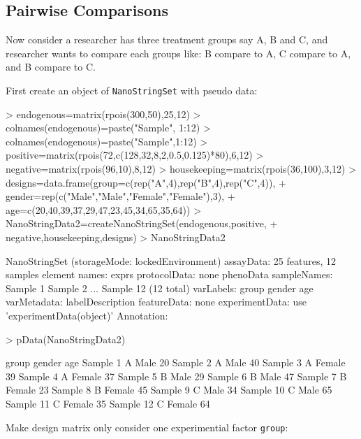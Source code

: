 \documentclass[12pt]{article}
\begin{document}
\subsection{Pairwise Comparisons}
Now consider a researcher has three treatment groups say A, B and C, 
and researcher wants to compare each groups like: B compare to A, 
C compare to A, and B compare to C.


First create an object of {\tt NanoStringSet} with pseudo data:
\begin{Schunk}
\begin{Sinput}
> endogenous=matrix(rpois(300,50),25,12)
> colnames(endogenous)=paste("Sample", 1:12)
> colnames(endogenous)=paste("Sample",1:12)
> positive=matrix(rpois(72,c(128,32,8,2,0.5,0.125)*80),6,12)
> negative=matrix(rpois(96,10),8,12)
> housekeeping=matrix(rpois(36,100),3,12)
> designs=data.frame(group=c(rep("A",4),rep("B",4),rep("C",4)),
+                    gender=rep(c("Male","Male","Female","Female"),3),
+                    age=c(20,40,39,37,29,47,23,45,34,65,35,64))
> NanoStringData2=createNanoStringSet(endogenous,positive,
+                                  negative,housekeeping,designs)
> NanoStringData2
\end{Sinput}
\begin{Soutput}
NanoStringSet (storageMode: lockedEnvironment)
assayData: 25 features, 12 samples 
  element names: exprs 
protocolData: none
phenoData
  sampleNames: Sample 1 Sample 2 ... Sample 12 (12 total)
  varLabels: group gender age
  varMetadata: labelDescription
featureData: none
experimentData: use 'experimentData(object)'
Annotation:  
\end{Soutput}
\begin{Sinput}
> pData(NanoStringData2)
\end{Sinput}
\begin{Soutput}
          group gender age
Sample 1      A   Male  20
Sample 2      A   Male  40
Sample 3      A Female  39
Sample 4      A Female  37
Sample 5      B   Male  29
Sample 6      B   Male  47
Sample 7      B Female  23
Sample 8      B Female  45
Sample 9      C   Male  34
Sample 10     C   Male  65
Sample 11     C Female  35
Sample 12     C Female  64
\end{Soutput}
\end{Schunk}



Make design matrix only consider one experimential factor {\tt group}: 
\begin{Schunk}
\end{Schunk}
\end{document}
